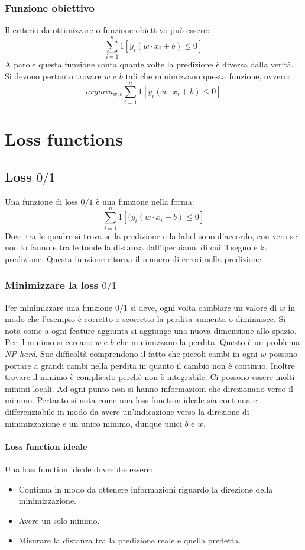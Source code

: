 		\subsubsection{Funzione obiettivo}
		Il criterio da ottimizzare o funzione obiettivo pu\`o essere:
		$$\sum\limits_{i=1}^n1[y_i(w\cdot x_i+b)\le 0]$$
		A parole questa funzione conta quante volte la predizione \`e diversa dalla verit\`a. 
		Si devono pertanto trovare $w$ e $b$ tali che minimizzano questa funzione, ovvero:
		$$argmin_{w,b}\sum\limits_{i=1}^n1[y_i(w\cdot x_i+b)\le 0]$$

\section{Loss functions}

	\subsection{Loss $0/1$}
	Una funzione di loss $0/1$ \`e una funzione nella forma:
	$$\sum\limits_{i=1}^n1[(y_i(w\cdot x_i+b)\le 0]$$
	Dove tra le quadre si trova se la predizione e la label sono d'accordo, con vero se non lo fanno e tra le tonde la distanza dall'iperpiano, di cui il segno \`e la predizione.
	Questa funzione ritorna il numero di errori nella predizione.

		\subsubsection{Minimizzare la loss $0/1$}
		Per minimizzare una funzione $0/1$ si deve, ogni volta cambiare un valore di $w$ in modo che l'esempio \`e corretto o scorretto la perdita aumenta o diminuisce.
		Si nota come a ogni feature aggiunta si aggiunge una nuova dimensione allo spazio.
		Per il minimo si cercano $w$ e $b$ che minimizzano la perdita.
		Questo \`e un problema \emph{NP-hard}.
		Sue difficolt\`a comprendono il fatto che piccoli cambi in ogni $w$ possono portare a grandi cambi nella perdita in quanto il cambio non \`e continuo. 
		Inoltre trovare il minimo \`e complicato perch\`e non \`e integrabile.
		Ci possono essere molti minimi locali.
		Ad ogni punto non si hanno informazioni che direzionano verso il minimo.
		Pertanto si nota come una loss function ideale sia continua e differenziabile in modo da avere un'indicazione verso la direzione di minimizzazione e un unico minimo, dunque unici $b$ e $w$.
		
		\paragraph{Loss function ideale}
		Una loss function ideale dovrebbe essere:
		\begin{itemize}
			\item Continua in modo da ottenere informazioni riguardo la direzione della minimizzazione.
			\item Avere un solo minimo.
			\item Misurare la distanza tra la predizione reale e quella predetta.
		\end{itemize}

